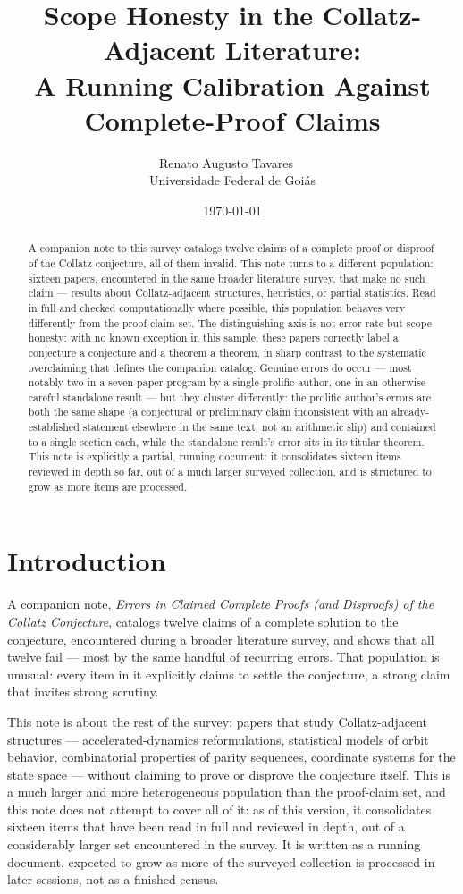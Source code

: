 \documentclass[11pt]{article}
\title{Scope Honesty in the Collatz-Adjacent Literature:\\
A Running Calibration Against Complete-Proof Claims}
\author{Renato Augusto Tavares~{\small\href{mailto:dr.renatotavares@gmail.com}{\textcolor{black}{\faEnvelope}}}~\orcidlink{0009-0002-0196-3311}\\
\normalsize Universidade Federal de Goiás}
\date{\today}
\begin{document}
\maketitle

\begin{abstract}
A companion note to this survey catalogs twelve claims of a complete
proof or disproof of the Collatz conjecture, all of them invalid. This
note turns to a different population: sixteen papers, encountered in
the same broader literature survey, that make no such claim --- results
about Collatz-adjacent structures, heuristics, or partial statistics.
Read in full and checked computationally where possible, this
population behaves very differently from the proof-claim set. The
distinguishing axis is not error rate but scope honesty: with no known
exception in this sample, these papers correctly label a conjecture a
conjecture and a theorem a theorem, in sharp contrast to the systematic
overclaiming that defines the companion catalog. Genuine errors do
occur --- most notably two in a seven-paper program by a single
prolific author, one
in an otherwise careful standalone result --- but they cluster
differently: the prolific author's errors are both the same shape (a
conjectural or preliminary claim inconsistent with an
already-established statement elsewhere in the same text, not an
arithmetic slip) and contained to a single section each, while the
standalone result's error sits in its titular theorem. This note is
explicitly a partial, running document: it consolidates sixteen items
reviewed in depth so far, out of a much larger surveyed collection, and
is structured to grow as more items are processed.
\end{abstract}

\section{Introduction}
\label{sec:intro}

A companion note, \emph{Errors in Claimed Complete Proofs (and
Disproofs) of the Collatz Conjecture}, catalogs twelve claims of a
complete solution to the conjecture, encountered during a broader
literature survey, and shows that all twelve fail --- most by the same
handful of recurring errors. That population is unusual: every item in
it explicitly claims to settle the conjecture, a strong claim that
invites strong scrutiny.

This note is about the rest of the survey: papers that study
Collatz-adjacent structures --- accelerated-dynamics reformulations,
statistical models of orbit behavior, combinatorial properties of
parity sequences, coordinate systems for the state space --- without
claiming to prove or disprove the conjecture itself. This is a much
larger and more heterogeneous population than the proof-claim set, and
this note does not attempt to cover all of it: as of this version, it
consolidates sixteen items that have been read in full and reviewed in
depth, out of a considerably larger set encountered in the survey. It
is written as a running document, expected to grow as more of the
surveyed collection is processed in later sessions, not as a finished
census.
\end{document}
